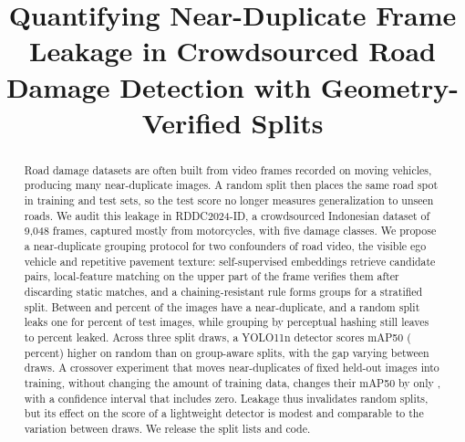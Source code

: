 \documentclass[conference,a4paper]{IEEEtran}
\begin{document}
\title{Quantifying Near-Duplicate Frame Leakage in Crowdsourced Road Damage Detection with Geometry-Verified Splits}

\author{
}

\maketitle

\begin{abstract}
Road damage datasets are often built from video frames recorded on moving vehicles, producing many near-duplicate images. A random split then places the same road spot in training and test sets, so the test score no longer measures generalization to unseen roads. We audit this leakage in RDDC2024-ID, a crowdsourced Indonesian dataset of 9,048 frames, captured mostly from motorcycles, with five damage classes. We propose a near-duplicate grouping protocol for two confounders of road video, the visible ego vehicle and repetitive pavement texture: self-supervised embeddings retrieve candidate pairs, local-feature matching on the upper part of the frame verifies them after discarding static matches, and a chaining-resistant rule forms groups for a stratified split. Between \PrevStrong{} and \NDshare{} percent of the images have a near-duplicate, and a random split leaks one for \LeakRand{} percent of test images, while grouping by perceptual hashing still leaves \LeakPhTen{} to \LeakPhSix{} percent leaked. Across three split draws, a YOLO11n detector scores \InflFifty{} mAP50 (\InflFiftyRel{} percent) higher on random than on group-aware splits, with the gap varying between draws. A crossover experiment that moves near-duplicates of fixed held-out images into training, without changing the amount of training data, changes their mAP50 by only \InjDiff{}, with a confidence interval that includes zero. Leakage thus invalidates random splits, but its effect on the score of a lightweight detector is modest and comparable to the variation between draws. We release the split lists and code.
\end{abstract}
\end{document}
